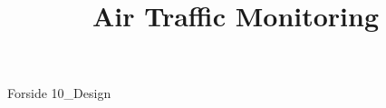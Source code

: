 \documentclass[a4paper,openany]{memoir}
\title{Air Traffic Monitoring}
\begin{document}
	{Forside}  \newpage
	\tableofcontents\thispagestyle{fancy}  \newpage
	{10_Design}  \newpage
\end{document}

